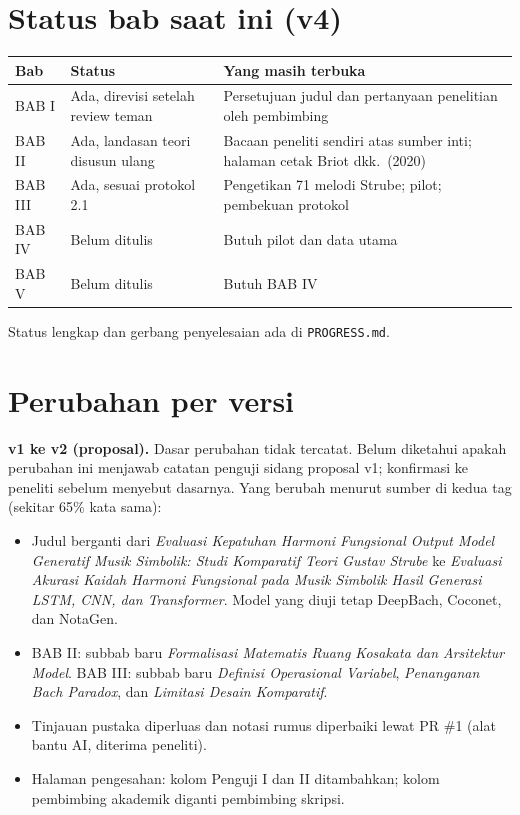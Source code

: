 \documentclass[a4paper,10pt]{article}
\begin{document}
\section{Status bab saat ini (v4)}

\begin{tabularx}{\linewidth}{L{2.2cm} L{6cm} Y}
\toprule
\textbf{Bab} & \textbf{Status} & \textbf{Yang masih terbuka} \\
\midrule
BAB I & Ada, direvisi setelah review teman & Persetujuan judul dan pertanyaan penelitian oleh pembimbing \\
BAB II & Ada, landasan teori disusun ulang & Bacaan peneliti sendiri atas sumber inti; halaman cetak Briot dkk.\ (2020) \\
BAB III & Ada, sesuai protokol 2.1 & Pengetikan 71 melodi Strube; pilot; pembekuan protokol \\
BAB IV & Belum ditulis & Butuh pilot dan data utama \\
BAB V & Belum ditulis & Butuh BAB IV \\
\bottomrule
\end{tabularx}

Status lengkap dan gerbang penyelesaian ada di \texttt{PROGRESS.md}.

\section{Perubahan per versi}

\textbf{v1 ke v2 (proposal).} Dasar perubahan tidak tercatat. Belum diketahui apakah perubahan ini menjawab catatan penguji sidang proposal v1; konfirmasi ke peneliti sebelum menyebut dasarnya. Yang berubah menurut sumber di kedua tag (sekitar 65\% kata sama):
\begin{itemize}
  \item Judul berganti dari \textit{Evaluasi Kepatuhan Harmoni Fungsional Output Model Generatif Musik Simbolik: Studi Komparatif Teori Gustav Strube} ke \textit{Evaluasi Akurasi Kaidah Harmoni Fungsional pada Musik Simbolik Hasil Generasi LSTM, CNN, dan Transformer}. Model yang diuji tetap DeepBach, Coconet, dan NotaGen.
  \item BAB II: subbab baru \textit{Formalisasi Matematis Ruang Kosakata dan Arsitektur Model}. BAB III: subbab baru \textit{Definisi Operasional Variabel}, \textit{Penanganan Bach Paradox}, dan \textit{Limitasi Desain Komparatif}.
  \item Tinjauan pustaka diperluas dan notasi rumus diperbaiki lewat PR \#1 (alat bantu AI, diterima peneliti).
  \item Halaman pengesahan: kolom Penguji I dan II ditambahkan; kolom pembimbing akademik diganti pembimbing skripsi.
\end{itemize}
\end{document}
